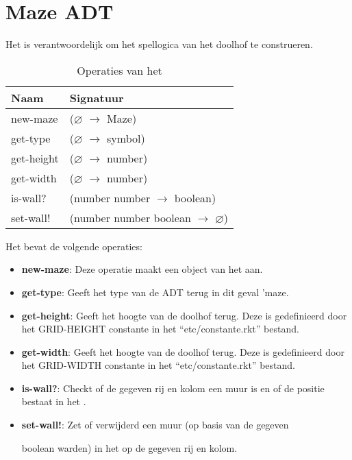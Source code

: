 
\section{Maze ADT}
\label{section:maze}
Het \texttt{} is verantwoordelijk om het spellogica van het doolhof te construeren.

\begin{table}[hbt]
\centering
\begin{tabular}{|ll|}
\hline
\rowcolor[HTML]{000000} 
{\color[HTML]{FFFFFF} \textbf{Naam}} & {\color[HTML]{FFFFFF} \textbf{Signatuur}} \\ \hline
new-maze   & ($\varnothing$ $\rightarrow$ Maze)                          \\ \hline
get-type   & ($\varnothing$ $\rightarrow$ symbol)                        \\ \hline
get-height & ($\varnothing$ $\rightarrow$ number)                        \\ \hline
get-width  & ($\varnothing$ $\rightarrow$ number)                        \\ \hline
is-wall?   & (number number $\rightarrow$ boolean)                       \\ \hline
set-wall!  & (number number boolean $\rightarrow$ $\varnothing$)         \\ \hline
\end{tabular}
\caption{Operaties van het \texttt{}}
\label{table:maze}
\end{table}

Het \texttt{} bevat de volgende operaties:

\begin{itemize}
	\item \textbf{new-maze}: Deze operatie maakt een object van het \texttt{} aan.
	\item \textbf{get-type}: Geeft het type van de ADT terug in dit geval 'maze.
	\item \textbf{get-height}: Geeft het hoogte van de doolhof terug.
		Deze is gedefinieerd door het GRID-HEIGHT constante in het ``etc/constante.rkt'' bestand.
	\item \textbf{get-width}: Geeft het hoogte van de doolhof terug.
		Deze is gedefinieerd door het GRID-WIDTH constante in het ``etc/constante.rkt'' bestand.
	\item \textbf{is-wall?}: Checkt of de gegeven rij en kolom een muur is en of de positie bestaat in het \texttt{}.
	\item \textbf{set-wall!}: Zet of verwijderd een muur 
		(op basis van de gegeven

		boolean warden) in het \texttt{} op de gegeven rij en kolom.
\end{itemize}

